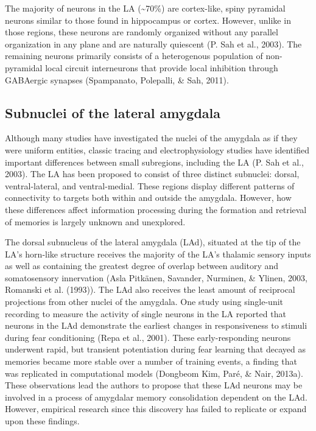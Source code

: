 \documentclass[12pt,a4paperpaper,]{report}
\begin{document}
The majority of neurons in the LA (\textasciitilde{}70\%) are
cortex-like, spiny pyramidal neurons similar to those found in
hippocampus or cortex. However, unlike in those regions, these neurons
are randomly organized without any parallel organization in any plane
and are naturally quiescent (P. Sah et al., 2003). The remaining neurons
primarily consists of a heterogenous population of non-pyramidal local
circuit interneurons that provide local inhibition through GABAergic
synapses (Spampanato, Polepalli, \& Sah, 2011).

\subsection{Subnuclei of the lateral
amygdala}\label{subnuclei-of-the-lateral-amygdala}

Although many studies have investigated the nuclei of the amygdala as if
they were uniform entities, classic tracing and electrophysiology
studies have identified important differences between small subregions,
including the LA (P. Sah et al., 2003). The LA has been proposed to
consist of three distinct subnuclei: dorsal, ventral-lateral, and
ventral-medial. These regions display different patterns of connectivity
to targets both within and outside the amygdala. However, how these
differences affect information processing during the formation and
retrieval of memories is largely unknown and unexplored.

The dorsal subnucleus of the lateral amygdala (LAd), situated at the tip
of the LA's horn-like structure receives the majority of the LA's
thalamic sensory inputs as well as containing the greatest degree of
overlap between auditory and somatosensory innervation (Asla Pitkänen,
Savander, Nurminen, \& Ylinen, 2003, Romanski et al. (1993)). The LAd
also receives the least amount of reciprocal projections from other
nuclei of the amygdala. One study using single-unit recording to measure
the activity of single neurons in the LA reported that neurons in the
LAd demonstrate the earliest changes in responsiveness to stimuli during
fear conditioning (Repa et al., 2001). These early-responding neurons
underwent rapid, but transient potentiation during fear learning that
decayed as memories became more stable over a number of training events,
a finding that was replicated in computational models (Dongbeom Kim,
Paré, \& Nair, 2013a). These observations lead the authors to propose
that these LAd neurons may be involved in a process of amygdalar memory
consolidation dependent on the LAd. However, empirical research since
this discovery has failed to replicate or expand upon these findings.
\end{document}
